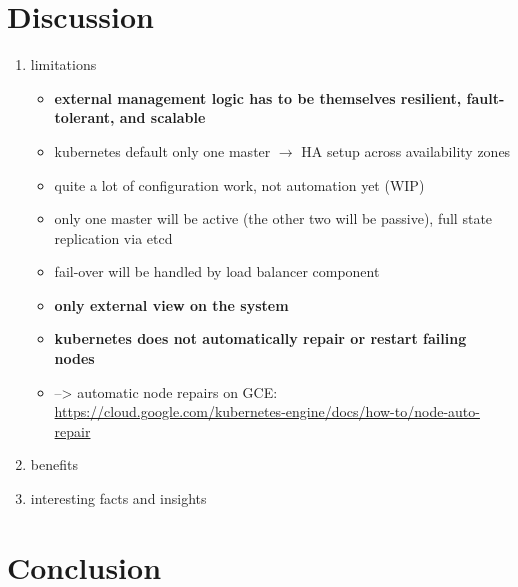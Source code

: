 \section{Discussion}
  \begin{enumerate}
    \item limitations
      \begin{itemize}
        \item \textbf{external management logic has to be themselves resilient, fault-tolerant, and scalable}
        \item \gls{kubernetes} default only one master $\rightarrow$ HA setup across availability zones
        \item quite a lot of configuration work, not automation yet (WIP)
        \item only one master will be active (the other two will be passive), full state replication via etcd
        \item fail-over will be handled by load balancer component
        \item \textbf{only external view on the system}
        \item \textbf{\gls{kubernetes} does not automatically repair or restart failing nodes}
        \item --> automatic node repairs on GCE: \url{https://cloud.google.com/kubernetes-engine/docs/how-to/node-auto-repair}
      \end{itemize}
    \item benefits
    \item interesting facts and insights
  \end{enumerate}
 
 \section{Conclusion}
